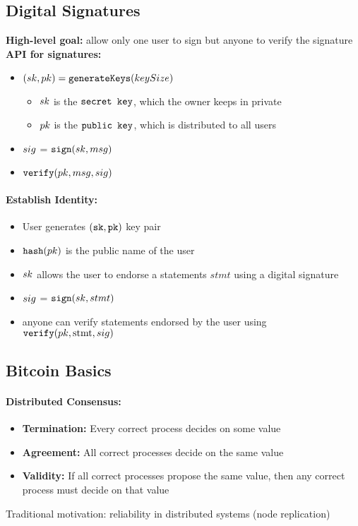\subsection{Digital Signatures}
\textbf{High-level goal: } allow only one user to sign but anyone to verify the signature\newline
\textbf{API for signatures: }
\begin{itemize}
    \item $(\textcolor{red}{sk}, \textcolor{green}{pk})=\texttt{\textcolor{blue}{generateKeys}}(keySize)$
        \begin{itemize}
            \item $\color{red}sk$ is the  $\texttt{\textcolor{red}{secret key}}$, which the owner keeps in private
            \item $\color{green}pk$ is the $\texttt{\textcolor{green}{public key}}$, which is distributed to all users
        \end{itemize}{} 
\item$\textcolor{orange}{sig}$ = $\texttt{\textcolor{blue}{sign}}(\textcolor{red}{sk}, msg)$
\item $\texttt{\textcolor{blue}{verify}}(\textcolor{green}{pk}, msg,\textcolor{orange}{sig})$
\end{itemize}{}
\paragraph{Establish Identity: }
\begin{itemize}
    \item User generates $(\texttt{\textcolor{red}{sk}}, \texttt{\textcolor{green}{pk}})$ key pair
    \item $\texttt{\textcolor{blue}{hash}}(\textcolor{green}{pk})$ is the public name of the user
    \item $\color{red}sk$ allows the user to endorse a statements $stmt$ using a digital signature
    \item $\color{orange}sig$ = $\texttt{\textcolor{blue}{sign}}(\textcolor{red}{sk}, stmt)$
    \item anyone can verify statements endorsed by the user using $\texttt{\textcolor{blue}{verify}}(\textcolor{green}{pk}, \text {stmt}, \textcolor{orange}{sig})$
\end{itemize}
\subsection{Bitcoin Basics}
\paragraph{Distributed Consensus: }
\begin{itemize}
    \item \textbf{Termination: } Every correct process decides on some value
    \item \textbf{Agreement: }  All correct processes decide on the same value
    \item \textbf{Validity: }  If all correct processes propose the same value, then any correct process must decide on that value
\end{itemize}
Traditional motivation: reliability in distributed systems (node replication)
